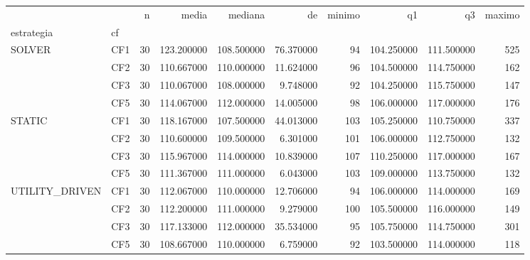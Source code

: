 \begin{tabular}{llrrrrrrrr}
\toprule
 &  & n & media & mediana & de & minimo & q1 & q3 & maximo \\
estrategia & cf &  &  &  &  &  &  &  &  \\
\midrule
\multirow[t]{4}{*}{SOLVER} & CF1 & 30 & 123.200000 & 108.500000 & 76.370000 & 94 & 104.250000 & 111.500000 & 525 \\
 & CF2 & 30 & 110.667000 & 110.000000 & 11.624000 & 96 & 104.500000 & 114.750000 & 162 \\
 & CF3 & 30 & 110.067000 & 108.000000 & 9.748000 & 92 & 104.250000 & 115.750000 & 147 \\
 & CF5 & 30 & 114.067000 & 112.000000 & 14.005000 & 98 & 106.000000 & 117.000000 & 176 \\
\cline{1-10}
\multirow[t]{4}{*}{STATIC} & CF1 & 30 & 118.167000 & 107.500000 & 44.013000 & 103 & 105.250000 & 110.750000 & 337 \\
 & CF2 & 30 & 110.600000 & 109.500000 & 6.301000 & 101 & 106.000000 & 112.750000 & 132 \\
 & CF3 & 30 & 115.967000 & 114.000000 & 10.839000 & 107 & 110.250000 & 117.000000 & 167 \\
 & CF5 & 30 & 111.367000 & 111.000000 & 6.043000 & 103 & 109.000000 & 113.750000 & 132 \\
\cline{1-10}
\multirow[t]{4}{*}{UTILITY_DRIVEN} & CF1 & 30 & 112.067000 & 110.000000 & 12.706000 & 94 & 106.000000 & 114.000000 & 169 \\
 & CF2 & 30 & 112.200000 & 111.000000 & 9.279000 & 100 & 105.500000 & 116.000000 & 149 \\
 & CF3 & 30 & 117.133000 & 112.000000 & 35.534000 & 95 & 105.750000 & 114.750000 & 301 \\
 & CF5 & 30 & 108.667000 & 110.000000 & 6.759000 & 92 & 103.500000 & 114.000000 & 118 \\
\cline{1-10}
\bottomrule
\end{tabular}
